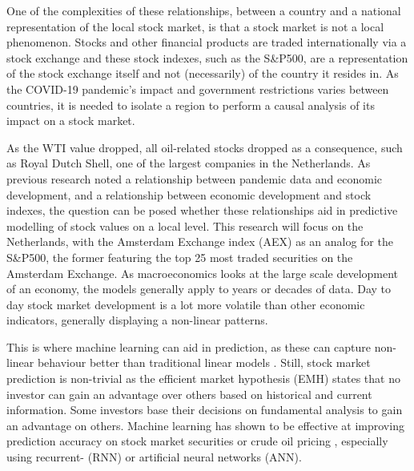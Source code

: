 One of the complexities of these relationships, between a country and a national representation of the local stock market, is that a stock market is not a local phenomenon. Stocks and other financial products are traded internationally via a stock exchange and these stock indexes, such as the S\&P500, are a representation of the stock exchange itself and not (necessarily) of the country it resides in. As the COVID-19 pandemic's impact and government restrictions varies between countries, it is needed to isolate a region to perform a causal analysis of its impact on a stock market.

As the WTI value dropped, all oil-related stocks dropped as a consequence, such as Royal Dutch Shell, one of the largest companies in the Netherlands. As previous research noted a relationship between pandemic data and economic development, and a relationship between economic development and stock indexes, the question can be posed whether these relationships aid in predictive modelling of stock values on a local level. This research will focus on the Netherlands, with the Amsterdam Exchange index (AEX) as an analog for the S\&P500, the former featuring the top 25 most traded securities on the Amsterdam Exchange. As macroeconomics looks at the large scale development of an economy, the models generally apply to years or decades of data. Day to day stock market development is a lot more volatile than other economic indicators, generally displaying a non-linear patterns. 

This is where machine learning can aid in prediction, as these can capture non-linear behaviour better than traditional linear models \cite{zhang2009stock}. Still, stock market prediction is non-trivial as the efficient market hypothesis (EMH) \cite{peters1996chaos} states that no investor can gain an advantage over others based on historical and current information. Some investors base their decisions on fundamental analysis \cite{lev1993fundamental} to gain an advantage on others. Machine learning has shown to be effective at improving prediction accuracy on stock market securities or crude oil pricing \cite{jain1996, YU20082623, zhang2009stock, thawornwong2004forecasting}, especially using recurrent- (RNN) or artificial neural networks (ANN).

